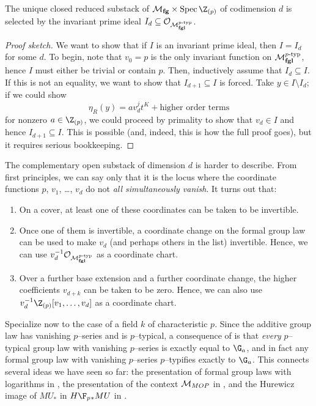 \begin{theorem}\label{LandwebersClassificationOfClosedSubstacks}
The unique closed reduced substack of $\moduli{fg} \times \Spec \Z_{(p)}$ of codimension $d$ is selected by the invariant prime ideal $I_d \subseteq \mathcal{O}_{\mathcal{M}_{\mathbf{fgl}}^{p\text{-}\mathrm{typ}}}$.
\end{theorem}
\begin{proof}[Proof sketch]
We want to show that if $I$ is an invariant prime ideal, then $I = I_d$ for some $d$.  To begin, note that $v_0 = p$ is the only invariant function on $\mathcal{M}_{\mathbf{fgl}}^{p\text{-}\mathrm{typ}}$, hence $I$ must either be trivial or contain $p$.  Then, inductively assume that $I_d \subseteq I$.  If this is not an equality, we want to show that $I_{d+1} \subseteq I$ is forced.  Take $y \in I \setminus I_d$; if we could show \[\eta_R(y) = a v_d^j t^K + \text{higher order terms}\] for nonzero $a \in \Z_{(p)}$, we could proceed by primality to show that $v_d \in I$ and hence $I_{d+1} \subseteq I$.  This is possible (and, indeed, this is how the full proof goes), but it requires serious bookkeeping.
\end{proof}

\begin{remark}\label{OpenSubstacksOfMfg}
The complementary open substack of dimension $d$ is harder to describe.  From first principles, we can say only that it is the locus where the coordinate functions $p$, $v_1$, \ldots, $v_d$ do not \emph{all simultaneously vanish}.  It turns out that:
\begin{enumerate}
\item On a cover, at least one of these coordinates can be taken to be invertible.\item Once one of them is invertible, a coordinate change on the formal group law can be used to make $v_d$ (and perhaps others in the list) invertible.  Hence, we can use $v_d^{-1} \mathcal{O}_{\mathcal{M}_{\mathbf{fgl}}^{p\text{-}\mathrm{typ}}}$ as a coordinate chart.
\item Over a further base extension and a further coordinate change, the higher coefficients $v_{d+k}$ can be taken to be zero.  Hence, we can also use $v_d^{-1} \Z_{(p)}[v_1, \ldots, v_d]$ as a coordinate chart.
\end{enumerate}
\end{remark}

\begin{remark}
Specialize now to the case of a field $k$ of characteristic $p$.  Since the additive group law has vanishing $p$--series and is $p$--typical, a consequence of  is that \emph{every} $p$--typical group law with vanishing $p$--series is exactly equal to $\G_a$, and in fact any formal group law with vanishing $p$--series $p$--typifies exactly to $\G_a$.  This connects several ideas we have seen so far: the presentation of formal group laws with logarithms in , the presentation of the context $\mathcal{M}_{MOP}$ in , and the Hurewicz image of $MU_*$ in $H\F_p{}_* MU$ in .
\end{remark}

